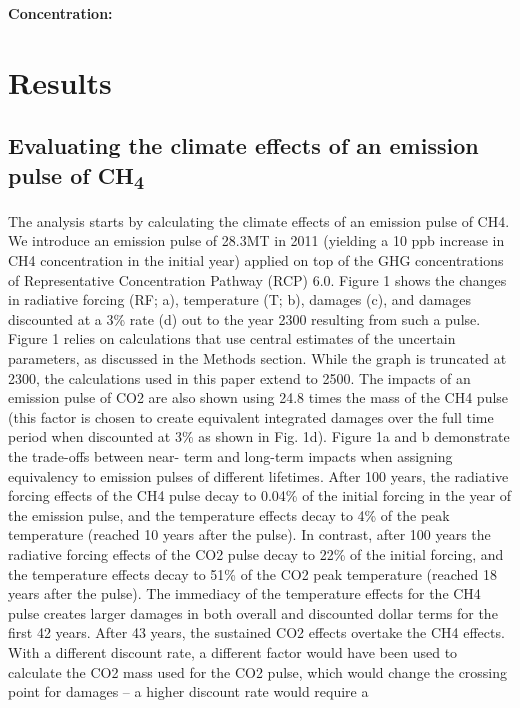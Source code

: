 \documentclass[gc, manuscript]{copernicus}
\begin{document}
\textbf{Concentration:}

\section{Results}

\subsection{\texorpdfstring{Evaluating the climate effects of an
emission pulse of
CH\textsubscript{4}}{Evaluating the climate effects of an emission pulse of CH}}

The analysis starts by calculating the climate effects of an emission
pulse of CH4. We introduce an emission pulse of 28.3MT in 2011 (yielding
a 10 ppb increase in CH4 concentration in the initial year) applied on
top of the GHG concentrations of Representative Concentration Pathway
(RCP) 6.0. Figure 1 shows the changes in radiative forcing (RF; a),
temperature (T; b), damages (c), and damages discounted at a 3\% rate
(d) out to the year 2300 resulting from such a pulse. Figure 1 relies on
calculations that use central estimates of the uncertain parameters, as
discussed in the Methods section. While the graph is truncated at 2300,
the calculations used in this paper extend to 2500. The impacts of an
emission pulse of CO2 are also shown using 24.8 times the mass of the
CH4 pulse (this factor is chosen to create equivalent integrated damages
over the full time period when discounted at 3\% as shown in Fig. 1d).
Figure 1a and b demonstrate the trade-offs between near- term and
long-term impacts when assigning equivalency to emission pulses of
different lifetimes. After 100 years, the radiative forcing effects of
the CH4 pulse decay to 0.04\% of the initial forcing in the year of the
emission pulse, and the temperature effects decay to 4\% of the peak
temperature (reached 10 years after the pulse). In contrast, after 100
years the radiative forcing effects of the CO2 pulse decay to 22\% of
the initial forcing, and the temperature effects decay to 51\% of the
CO2 peak temperature (reached 18 years after the pulse). The immediacy
of the temperature effects for the CH4 pulse creates larger damages in
both overall and discounted dollar terms for the first 42 years. After
43 years, the sustained CO2 effects overtake the CH4 effects. With a
different discount rate, a different factor would have been used to
calculate the CO2 mass used for the CO2 pulse, which would change the
crossing point for damages -- a higher discount rate would require a
\end{document}
